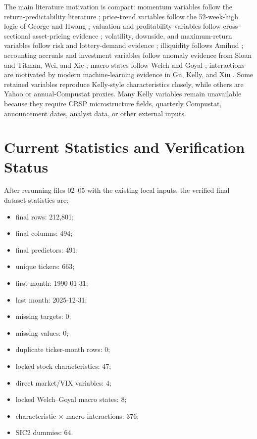 \documentclass[11pt,a4paper]{article}
\begin{document}
The main literature motivation is compact: momentum variables follow the return-predictability literature \cite{jegadeesh1993}; price-trend variables follow the 52-week-high logic of George and Hwang \cite{george2004}; valuation and profitability variables follow cross-sectional asset-pricing evidence \cite{fama1992,novymarx2013}; volatility, downside, and maximum-return variables follow risk and lottery-demand evidence \cite{ang2006,bali2011}; illiquidity follows Amihud \cite{amihud2002}; accounting accruals and investment variables follow anomaly evidence from Sloan and Titman, Wei, and Xie \cite{sloan1996,titman2004}; macro states follow Welch and Goyal \cite{welchgoyal2008}; interactions are motivated by modern machine-learning evidence in Gu, Kelly, and Xiu \cite{gkx2020}. Some retained variables reproduce Kelly-style characteristics closely, while others are Yahoo or annual-Compustat proxies. Many Kelly variables remain unavailable because they require CRSP microstructure fields, quarterly Compustat, announcement dates, analyst data, or other external inputs.

\section{Current Statistics and Verification Status}

After rerunning files 02--05 with the existing local inputs, the verified final dataset statistics are:
\begin{itemize}
  \item final rows: 212,801;
  \item final columns: 494;
  \item final predictors: 491;
  \item unique tickers: 663;
  \item first month: 1990-01-31;
  \item last month: 2025-12-31;
  \item missing targets: 0;
  \item missing values: 0;
  \item duplicate ticker-month rows: 0;
  \item locked stock characteristics: 47;
  \item direct market/VIX variables: 4;
  \item locked Welch--Goyal macro states: 8;
  \item characteristic $\times$ macro interactions: 376;
  \item SIC2 dummies: 64.
\end{itemize}
\end{document}
